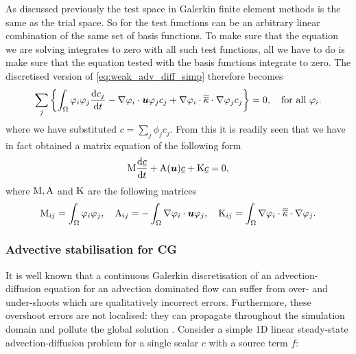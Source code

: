 As discussed previously the test space in Galerkin finite element methods is the same as the
trial space. So for \PN the test functions can be an arbitrary linear combination
of the same set of basis functions. To make sure that the equation we are solving
integrates to zero with all such test functions, all we have to do is make sure
that the equation tested with the basis functions integrate to zero. The discretised
version of \eqref{eq:weak_adv_diff_simp} therefore becomes
\begin{equation}
  \sum_j \left\{ \int_\Omega \varphi_i \varphi_j  \frac{\mathrm{d} c_j}{\mathrm{d} t} -
    \nabla\varphi_i\cdot{\mbox{\boldmath$u$}}\varphi_j  c_j +
    \nabla\varphi_i\cdot \overline{\overline{\kappa}}\cdot\nabla \varphi_j c_j \right\} = 0,
    \quad\text{for all }\varphi_i.
\end{equation}
where we have substituted $c=\sum_j \phi_j c_j$. From this it is readily seen that
we have in fact obtained a matrix equation of the following form
\begin{equation}
  \mathrm{M} \frac{\mathrm{d}\underline{c}}{\mathrm{d} t}+\mathrm{A}({\mbox{\boldmath$u$}})\underline{c}+\mathrm{K}\underline{c}=0,
  \label{eq:cg_adv_diff_mat}
\end{equation}
where $\mathrm{M}, \mathrm{A}$ and $\mathrm{K}$ are the following matrices
\begin{equation}
  \mathrm{M}_{ij}=\int_\Omega \varphi_i\varphi_j, \quad
  \mathrm{A}_{ij}=-\int_\Omega \nabla\varphi_i\cdot{\mbox{\boldmath$u$}} \varphi_j, \quad
  \mathrm{K}_{ij}=\int_\Omega \nabla\varphi_i\cdot \overline{\overline{\kappa}}\cdot\nabla \varphi_j.
\end{equation}

\subsubsection{Advective stabilisation for CG}
\label{sec:ND_advective_stabilisation_CG}

It is well known that a continuous Galerkin discretisation of an
advection-diffusion equation for an advection dominated flow can suffer from
over- and under-shoots which are qualitatively incorrect errors. Furthermore, these overshoot errors are not
localised: they can propagate throughout the simulation domain and pollute the
global solution \citep{hughes1987}. Consider a simple 1D linear steady-state
advection-diffusion problem for a single scalar $c$ with a source term $f$:

